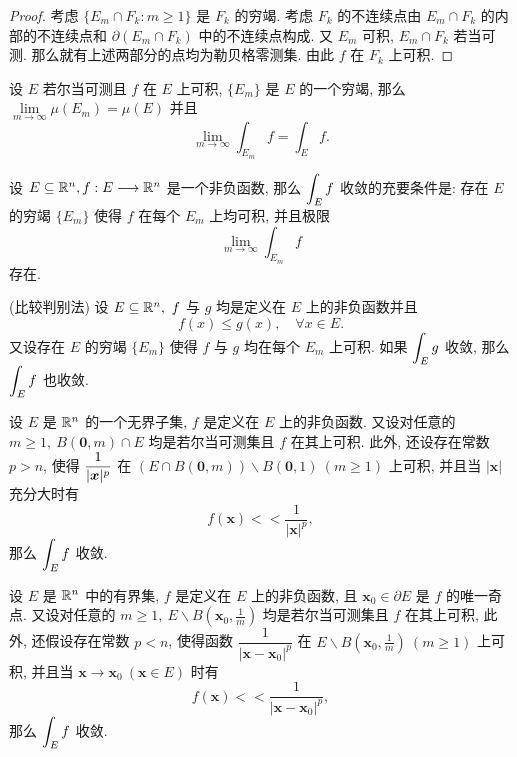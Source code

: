 \begin{proof}
	考虑 $\{E_m\cap F_k:m\geqslant 1\}$ 是 $F_k$ 的穷竭. 考虑 $F_k$ 的不连续点由 $E_m\cap F_k$ 的内部的不连续点和 $\partial(E_m\cap F_k)$ 中的不连续点构成. 又 $E_m$ 可积, $E_m\cap F_k$ 若当可测. 那么就有上述两部分的点均为勒贝格零测集. 由此 $f$ 在 $F_k$ 上可积.
\end{proof}

\begin{proposition}
	设 $E$ 若尔当可测且 $f$ 在 $E$ 上可积, $\{E_m\}$ 是 $E$ 的一个穷竭, 那么 $\lim\limits_{m\to\infty}\mu(E_m)=\mu(E)$ 并且 $$\lim\limits_{m\to\infty} \int_{E_m} f = \int_E f.$$
\end{proposition}

\begin{proposition}
	设 $E\subseteq \mathbb {R}^{n},f:E\longrightarrow \mathbb {R}^{n}$ 是一个非负函数, 那么 $\displaystyle {\int_E f}$ 收敛的充要条件是: 存在 $E$ 的穷竭 $\{E_m\}$ 使得 $f$ 在每个 $E_m$ 上均可积, 并且极限 $$\lim\limits_{m\to\infty}\int_{E_m} f$$ 存在.
\end{proposition}

\begin{proposition}(比较判别法)
	设 $E\subseteq \set R n,\ f$ 与 $g$ 均是定义在 $E$ 上的非负函数并且 $$f(x)\leqslant g(x),\quad \forall x\in E.$$ 又设存在 $E$ 的穷竭 $\{E_m\}$ 使得 $f$ 与 $g$ 均在每个 $E_m$ 上可积. 如果 $\displaystyle {\int_E g}$ 收敛, 那么 $\displaystyle {\int_E f}$ 也收敛.
\end{proposition}

\begin{proposition}
	设 $E$ 是 $\mathbb {R}^{n}$ 的一个无界子集, $f$ 是定义在 $E$ 上的非负函数. 又设对任意的 $m\geqslant 1,\ B(\bm 0,m)\cap E$ 均是若尔当可测集且 $f$ 在其上可积. 此外, 还设存在常数 $p>n$, 使得 $\displaystyle {\frac{1}{|\bm x|^p}}$ 在 $(E\cap B(\bm 0,m))\backslash B(\bm 0,1)\ (m\geqslant 1)$ 上可积, 并且当 $|\bm x|$ 充分大时有 $$f(\bm x)<<\frac{1}{|\bm x|^p},$$ 那么 $\displaystyle {\int_E f}$ 收敛.
\end{proposition}

\begin{proposition}
	设 $E$ 是 $\mathbb {R}^{n}$ 中的有界集, $f$ 是定义在 $E$ 上的非负函数, 且 $\bm x_0 \in \partial E$ 是 $f$ 的唯一奇点. 又设对任意的 $m\geqslant 1,\ E\backslash B(\bm x_0,\frac 1 m)$ 均是若尔当可测集且 $f$ 在其上可积, 此外, 还假设存在常数 $p<n$, 使得函数 $\dfrac{1}{|\bm x-\bm x_0|^p}$ 在 $E\backslash B(\bm x_0,\frac 1 m)\ (m\geqslant 1)$ 上可积, 并且当 $\bm x \to \bm x_0\ (\bm x \in E)$ 时有 $$f(\bm x)<<\frac{1}{|\bm x-\bm x_0|^p},$$ 那么 $\displaystyle {\int_E f}$ 收敛. 
\end{proposition}


